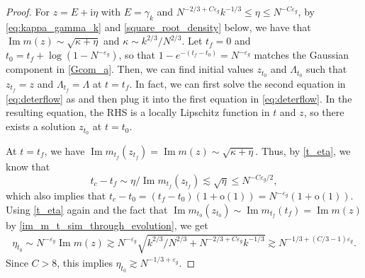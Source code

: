 \documentclass[10pt,reqno]{amsart}
\numberwithin{equation}{section}
\numberwithin{figure}{section}
\theoremstyle{plain} %
\theoremstyle{definition} %
\newcommand{\ii}{\mathrm{i}}
\newcommand{\pa}[1]{\left({#1}\right)}
\DeclareMathOperator{\im}{\mathrm{Im}}
\newcommand{\e}{{\varepsilon}}
\newcommand{\oo}{\mathrm{o}}
\numberwithin{equation}{section}
\begin{document}
\begin{proof}
For $z=E+\ii \eta$ with $E=\gamma_k$ and $N^{-2/3+C\varepsilon_g}k^{-1/3}\le \eta \le N^{-C\varepsilon_g}$, by \eqref{eq:kappa_gamma_k} and \eqref{square_root_density} below, we have that $\im m (z) \sim \sqrt{\kappa+\eta}$ and $\kappa\sim k^{2/3}/N^{2/3}$. Let $t_f=0$ and $t_0=t_f+\log(1- N^{-\e_g})$, so that $1-e^{-(t_f-t_0)}=N^{-\e_g}$ matches the Gaussian component in \eqref{Gcom_a}. Then, we can find initial values $z_{t_0}$ and $\Lambda_{t_0}$ such that $z_{t_f}=z$ and $\Lambda_{t_f}=\Lambda$ at $t=t_f$. In fact, we can first solve the second equation in \eqref{eq:deterflow} as  and then plug it into the first equation in \eqref{eq:deterflow}. In the resulting equation, the RHS is a locally Lipschitz function in $t$ and $z$, so there exists a solution $z_{t_0}$ at $t=t_0$.

At $t=t_f$, we have $\im m_{t_f}(z_{t_f})=\im m (z) \sim \sqrt{\kappa+\eta}$. Thus, by \eqref{t_eta}, we know that 
\[t_c-t_f\sim \eta/\im m_{t_f}\pa{z_{t_f}}\lesssim \sqrt{\eta}\le N^{-C\varepsilon_g/2} ,\] 
which also implies that $t_c-t_0=(t_f-t_0)(1+\oo(1))=N^{-\e_g}(1+\oo(1))$. Using \eqref{t_eta} again and the fact that $\im m_{t_0}\pa{z_{t_0}}\sim \im m_{t_f}\pa{t_f}=\im m (z) $ by \eqref{im_m_t_sim_through_evolution}, we get
    \begin{equation}\nonumber
        \begin{aligned}
            \eta_{t_0}\sim N^{-\varepsilon_g}\im m (z) \gtrsim N^{-\varepsilon_g}\sqrt{k^{2/3}/N^{2/3}+N^{-2/3+C\varepsilon_g}k^{-1/3}}\gtrsim N^{-1/3+\pa{C/3-1}\varepsilon_g}.
        \end{aligned}
    \end{equation}
 Since $C>8$, this implies $\eta_{t_0}\gtrsim N^{-1/3+\varepsilon_g}$.


\end{proof}
\end{document}
